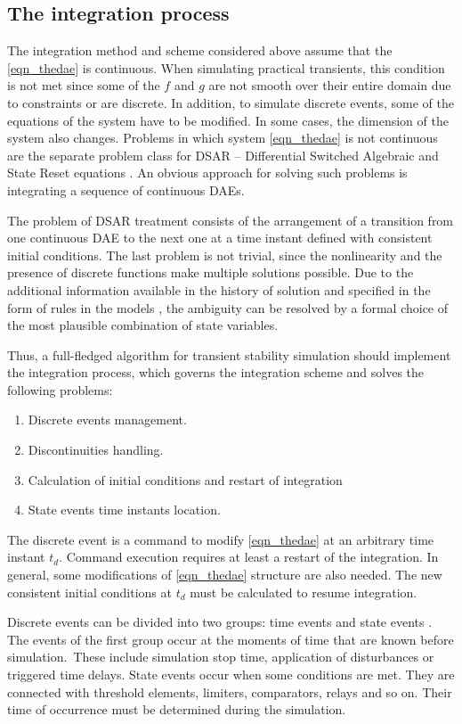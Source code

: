 \documentclass[lettersize,journal]{IEEEtran}
\begin{document}
\subsection {The integration process}
The integration method and scheme considered above assume that the \eqref{eqn_thedae} is continuous. When simulating practical transients, this condition is not met since some of the \(f\) and \(g\) are not smooth over their entire domain due to constraints or are discrete. In addition, to simulate discrete events, some of the equations of the system have to be modified. In some cases, the dimension of the system also changes. Problems in which system \eqref{eqn_thedae} is not continuous are the separate problem class for DSAR -- Differential Switched Algebraic and State Reset equations \cite{Hiskens01}. An obvious approach for solving such problems is integrating a sequence of continuous DAEs.

The problem of DSAR treatment consists of the arrangement of a transition from one continuous DAE to the next one at a time instant defined with consistent initial conditions. The last problem is not trivial, since the nonlinearity and the presence of discrete functions make multiple solutions possible. Due to the additional information available in the history of solution and specified in the form of rules in the models \cite{mycompiler}, the ambiguity can be resolved by a formal choice of the most plausible combination of state variables.

Thus, a full-fledged algorithm for transient stability simulation should implement the integration process, which governs the integration scheme and solves the following problems:
\begin{enumerate}
	\item Discrete events management.
	\item Discontinuities handling.
	\item Calculation of initial conditions and restart of integration
	\item State events time instants location.
\end{enumerate}

The discrete event is a command to modify \eqref{eqn_thedae} at an arbitrary time instant \(t_d\). Command execution requires at least a restart of the integration. In general, some modifications of \eqref{eqn_thedae} structure are also needed. The new consistent initial conditions at \(t_d\) must be calculated to resume integration.

Discrete events can be divided into two groups: time events and state events \cite{cellier06}.  The events of the first group occur at the moments of time that are known before simulation. These include simulation stop time, application of disturbances or triggered time delays. State events occur when some conditions are met. They are connected with threshold elements, limiters, comparators, relays and so on.  Their time of occurrence must be determined during the simulation. 
\end{document}
